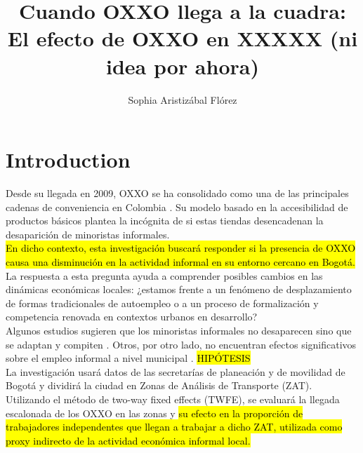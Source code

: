 \documentclass{article}
\title{Cuando OXXO llega a la cuadra: El efecto de OXXO en XXXXX (ni idea por ahora)}
\author{Sophia Aristizábal Flórez}
\begin{document}
\maketitle

\section{Introduction}
Desde su llegada en 2009, OXXO se ha consolidado como una de las principales cadenas de conveniencia en Colombia \parencite{m_2025}. Su modelo basado en la accesibilidad de productos básicos plantea la incógnita de si estas tiendas desencadenan la desaparición de minoristas informales. \\

\hl{En dicho contexto, esta investigación buscará responder si la presencia de OXXO causa una disminución en la actividad informal en su entorno cercano en Bogotá.} La respuesta a esta pregunta ayuda a comprender posibles cambios en las dinámicas económicas locales: ¿estamos frente a un fenómeno de desplazamiento de formas tradicionales de autoempleo o a un proceso de formalización y competencia renovada en contextos urbanos en desarrollo? \\

Algunos estudios sugieren que los minoristas informales no desaparecen sino que se adaptan y compiten \parencite{marcos2022}. Otros, por otro lado, no encuentran efectos significativos sobre el empleo informal a nivel municipal \parencite{delgado2024}. \hl{HIPÓTESIS}\\

La investigación usará datos de las secretarías de planeación y de movilidad de Bogotá y dividirá la ciudad en Zonas de Análisis de Transporte  (ZAT).  Utilizando el método de two-way fixed effects (TWFE), se evaluará la llegada escalonada de los OXXO en las zonas y \hl{su efecto en la proporción de trabajadores independentes que llegan a trabajar a dicho ZAT, utilizada como proxy indirecto de la actividad económica informal local.} 
\end{document}
